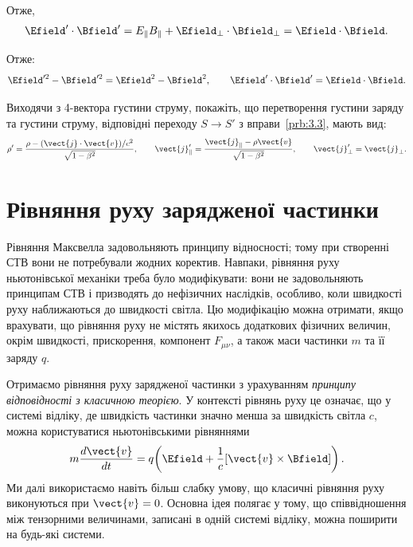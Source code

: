 \begin{problem}
\begin{itemize}
Отже,
\begin{equation*}
    \Efield' \cdot \Bfield' = E_\parallel B_\parallel + \Efield_\perp \cdot \Bfield_\perp = \Efield \cdot \Bfield.
\end{equation*}

\end{itemize}


Отже:
\begin{equation*}
    \Efield'^2 - \Bfield'^2 = \Efield^2 - \Bfield^2, \qquad
    \Efield' \cdot \Bfield' = \Efield \cdot \Bfield.
\end{equation*}

\end{problem}

\begin{problem}
Виходячи з 4-вектора густини струму, покажіть, що перетворення густини заряду та густини струму, відповідні переходу $S\to S'$ з вправи~\ref{prb:3.3}, мають вид:
\begin{equation*}
    \rho' = \frac{\rho - (\vect{j}\cdot\vect{v})/c^2}{\sqrt{1-\beta^2}},
    \qquad
    \vect{j}'_{\|} = \frac{\vect{j}_{\|} - \rho\vect{v}}{\sqrt{1-\beta^2}},
    \qquad
    \vect{j}'_{\bot} = \vect{j}_{\bot}.
\end{equation*}
\end{problem}

\section{Рівняння руху зарядженої частинки}

Рівняння Максвелла задовольняють принципу відносності; тому при створенні СТВ вони не потребували жодних коректив. Навпаки, рівняння руху ньютонівської механіки треба було модифікувати: вони не задовольняють принципам СТВ і призводять до нефізичних наслідків, особливо, коли швидкості руху наближаються до швидкості світла. Цю модифікацію можна отримати, якщо врахувати, що рівняння руху не містять якихось додаткових фізичних величин, окрім швидкості, прискорення, компонент $F_{\mu\nu}$, а також маси частинки $m$ та її заряду $q$.

Отримаємо рівняння руху зарядженої частинки з урахуванням \emph{принципу відповідності з класичною теорією}. У контексті рівнянь руху це означає, що у системі відліку, де швидкість частинки значно менша за швидкість світла $c$, можна користуватися ньютонівськими рівняннями
\begin{equation*}
    m\frac{d\vect{v}}{dt} = q\!\left(\Efield
    + \frac{1}{c}[\vect{v}\times\Bfield]\right).
\end{equation*}
Ми далі використаємо навіть більш слабку умову, що класичні рівняння руху виконуються при $\vect{v}=0$. Основна ідея полягає у тому, що співвідношення між тензорними величинами, записані в одній системі відліку, можна поширити на будь-які системи.

